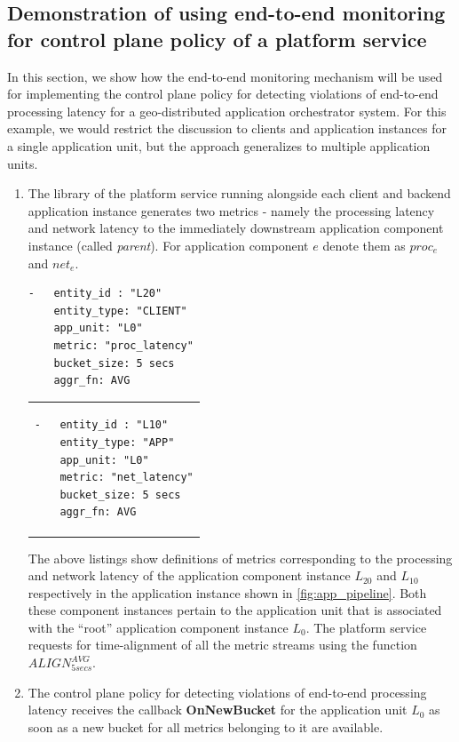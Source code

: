 \subsection{Demonstration of using end-to-end monitoring for control plane policy of a platform service}
In this section, we show how the end-to-end monitoring mechanism will be used for implementing the control plane policy for detecting violations of end-to-end processing latency for a geo-distributed application orchestrator system. For this example, we would restrict the discussion to clients and application instances for a single application unit, but the approach generalizes to multiple application units.
\begin{enumerate}
\item The library of the platform service running alongside each client and backend application instance generates two metrics - namely the processing latency and network latency to the immediately downstream application component instance (called \textit{parent}). For application component $e$ denote them as $proc_e$ and $net_e$.\\
\begin{minipage}{0.45\textwidth}
\begin{verbatim}
-   entity_id : "L20"
    entity_type: "CLIENT"
    app_unit: "L0"
    metric: "proc_latency"
    bucket_size: 5 secs
    aggr_fn: AVG
\end{verbatim}
\end{minipage}%
\hfill
\begin{minipage}{0.45\textwidth}
\begin{tabular}{p{\textwidth}}
\begin{verbatim}
-   entity_id : "L10"
    entity_type: "APP"
    app_unit: "L0"
    metric: "net_latency"
    bucket_size: 5 secs
    aggr_fn: AVG
\end{verbatim}
\end{tabular}
\end{minipage}

The above listings show definitions of metrics corresponding to the processing and network latency of the application component instance $L_{20}$ and $L_{10}$ respectively in the application instance shown in \cref{fig:app_pipeline}. Both these component instances pertain to the application unit that is associated with the ``root'' application component instance $L_0$. The platform service requests for time-alignment of all the metric streams using the function $ALIGN^{AVG}_{5secs}$. 
\item The control plane policy for detecting violations of end-to-end processing latency receives the callback \textbf{OnNewBucket} for the application unit $L_0$ as soon as a new bucket for all metrics belonging to it are available. 


\end{enumerate}
